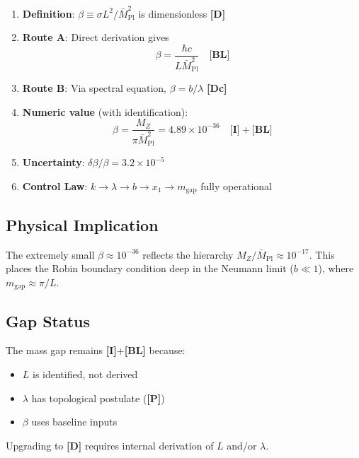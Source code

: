 \documentclass[11pt,a4paper]{article}
\newcommand{\Mpl}{\bar{M}_{\mathrm{Pl}}}
\newcommand{\mgap}{m_{\mathrm{gap}}}
\newcommand{\MZ}{M_Z}
\newcommand{\tagD}{\textbf{[D]}}
\newcommand{\tagDc}{\textbf{[Dc]}}
\newcommand{\tagI}{\textbf{[I]}}
\newcommand{\tagBL}{\textbf{[BL]}}
\newcommand{\tagP}{\textbf{[P]}}
\theoremstyle{definition}
\theoremstyle{plain}
\theoremstyle{remark}
\begin{document}
\begin{enumerate}
\item \textbf{Definition}: $\beta \equiv \sigma L^2/\Mpl^2$ is dimensionless \tagD{}

\item \textbf{Route A}: Direct derivation gives
\begin{equation}
\beta = \frac{\hbar c}{L\Mpl^2} \quad \tagBL{}
\end{equation}

\item \textbf{Route B}: Via spectral equation, $\beta = b/\lambda$ \tagDc{}

\item \textbf{Numeric value} (with identification):
\begin{equation}
\beta = \frac{\MZ}{\pi\Mpl^2} = 4.89 \times 10^{-36} \quad \tagI{}+\tagBL{}
\end{equation}

\item \textbf{Uncertainty}: $\delta\beta/\beta = 3.2 \times 10^{-5}$

\item \textbf{Control Law}: $k \to \lambda \to b \to x_1 \to \mgap$ fully operational
\end{enumerate}

\subsection{Physical Implication}

The extremely small $\beta \approx 10^{-36}$ reflects the hierarchy $\MZ/\Mpl \approx 10^{-17}$.
This places the Robin boundary condition deep in the Neumann limit ($b \ll 1$),
where $\mgap \approx \pi/L$.

\subsection{Gap Status}

The mass gap remains \tagI{}+\tagBL{} because:
\begin{itemize}
\item $L$ is identified, not derived
\item $\lambda$ has topological postulate (\tagP{})
\item $\beta$ uses baseline inputs
\end{itemize}

Upgrading to \tagD{} requires internal derivation of $L$ and/or $\lambda$.
\end{document}
